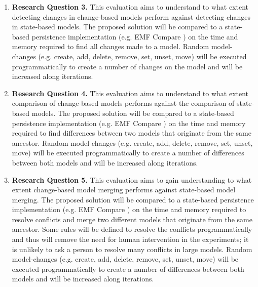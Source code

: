 \documentclass[12pt, a4paper]{report} \usepackage[titletoc]{appendix}
\begin{document}
\begin{enumerate}
    \item \textbf{Research Question 3.} This evaluation aims to understand to what extent detecting changes in change-based models perform against detecting changes in state-based models. The proposed solution will be compared to a state-based persistence implementation (e.g. EMF Compare \cite{eclipse2017compare}) on the time and memory required to find all changes made to a model. Random model-changes (e.g. create, add, delete, remove, set, unset, move) will be executed programmatically to create a number of changes on the model and will be increased along iterations. 
    
    \item \textbf{Research Question 4.} This evaluation aims to understand to what extent comparison of change-based models performs against the comparison of state-based models. The proposed solution will be compared to a state-based persistence implementation (e.g. EMF Compare \cite{eclipse2017compare}) on the time and memory required to find differences between two models that originate from the same ancestor. Random model-changes (e.g. create, add, delete, remove, set, unset, move) will be executed programmatically to create a number of differences between both models and will be increased along iterations.  
    
    \item \textbf{Research Question 5.} This evaluation aims to gain understanding to what extent change-based model merging performs against state-based model merging. The proposed solution will be compared to a state-based persistence implementation (e.g. EMF Compare \cite{eclipse2017compare}) on the time and memory required to resolve conflicts and merge two different models that originate from the same ancestor. Some rules will be defined to resolve the conflicts programmatically and thus will remove the need for human intervention in the experiments; it is unlikely to ask a person to resolve many conflicts in large models. Random model-changes (e.g. create, add, delete, remove, set, unset, move) will be executed programmatically to create a number of differences between both models and will be increased along iterations. 
\end{enumerate}
\end{document}
